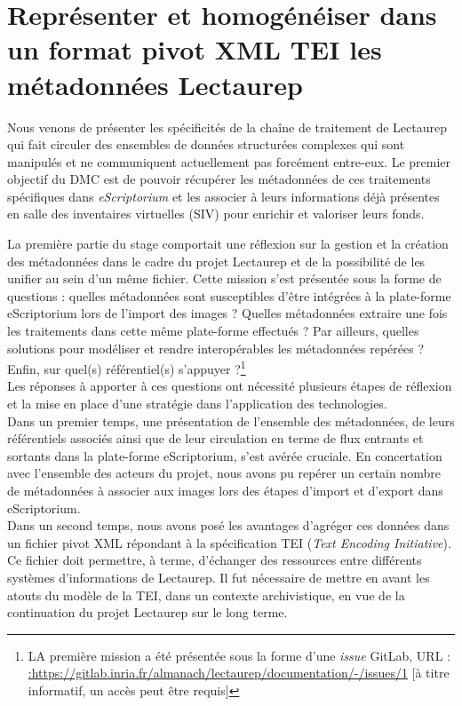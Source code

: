 \part{Représenter et homogénéiser dans un format pivot XML TEI les métadonnées Lectaurep}\label{partie_2}

Nous venons de présenter les spécificités de la chaîne de traitement de Lectaurep qui fait circuler des ensembles de données structurées complexes qui sont manipulés et ne communiquent actuellement pas forcément entre-eux. Le premier objectif du DMC est de pouvoir récupérer les métadonnées de ces traitements spécifiques dans \textit{eScriptorium} et les associer à leurs informations déjà présentes en salle des inventaires virtuelles (SIV) pour enrichir et valoriser leurs fonds.

La première partie du stage comportait une réflexion sur la gestion et la création des métadonnées dans le cadre du projet Lectaurep et de la possibilité de les unifier au sein d'un même fichier. Cette mission s'est présentée sous la forme de questions : quelles métadonnées sont susceptibles d'être intégrées à la plate-forme eScriptorium lors de l'import des images ? Quelles métadonnées extraire une fois les traitements dans cette même plate-forme effectués ? Par ailleurs, quelles solutions pour modéliser et rendre interopérables les  métadonnées repérées ? Enfin, sur quel(s) référentiel(s) s'appuyer ?\footnote{LA première mission a été présentée sous la forme d'une \textit{issue} GitLab, URL : \url{:https://gitlab.inria.fr/almanach/lectaurep/documentation/-/issues/1} [à titre informatif, un accès peut être requis]}\\

Les réponses à apporter à ces questions ont nécessité plusieurs étapes de réflexion et la mise en place d'une stratégie dans l'application des technologies.\\

Dans un premier temps, une présentation de l'ensemble des métadonnées, de leurs référentiels associés ainsi que de leur circulation en terme de flux entrants et sortants dans la plate-forme eScriptorium, s'est avérée cruciale. En concertation avec l'ensemble des acteurs du projet, nous avons pu repérer un certain nombre de métadonnées à associer aux images lors des étapes d'import et d'export dans eScriptorium.\\

Dans un second temps, nous avons posé les avantages d'agréger ces données dans un fichier pivot XML répondant à la spécification TEI (\textit{Text Encoding Initiative}). Ce fichier doit permettre, à terme, d'échanger des ressources entre différents systèmes d'informations de Lectaurep. Il fut nécessaire de mettre en avant les atouts du modèle de la TEI, dans un contexte archivistique, en vue de la continuation du projet Lectaurep sur le long terme.\\ 

